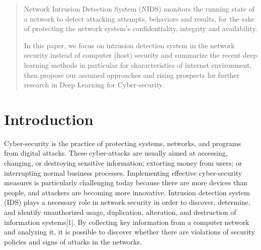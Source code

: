 \documentclass[conference]{IEEEtran}
\begin{document}
\begin{abstract}
Network Intrusion Detection System (NIDS) monitors the running state of a network to detect attacking attempts, behaviors and results, for the sake of protecting the network system's confidentiality, integrity and availability.

In this paper, we focus on intrusion detection system in the network security instead of computer (host) security and summarize the recent deep learning methods in particular for characteristics of internet environment, then propose our assumed approaches and rising prospects for further research in Deep Learning for Cyber-security.
\end{abstract}





%
\IEEEpeerreviewmaketitle



\section{Introduction}
Cyber-security is the practice of protecting systems, networks, and programs from digital attacks. These cyber-attacks are usually aimed at accessing, changing, or destroying sensitive information; extorting money from users; or interrupting normal business processes. Implementing effective cyber-security measures is particularly challenging today because there are more devices than people, and attackers are becoming more innovative. Intrusion detection system (IDS) plays a necessary role in network security in order to discover, determine, and identify unauthorized usage, duplication, alteration, and destruction of information systems[1]. By collecting key information from a computer network and analyzing it, it is possible to discover whether there are violations of security policies and signs of attacks in the networks. 
\end{document}

